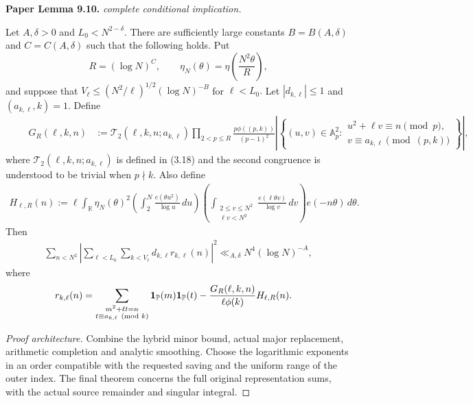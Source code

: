 \begin{lemma}
\label{goldbach_circle_method}
\leanok
\par\medskip\noindent\textbf{Paper Lemma 9.10.} \textit{complete conditional implication.}\par
Let \(A,\delta>0\) and \(L_0<N^{2-\delta}\).  There are sufficiently
large constants \(B=B(A,\delta)\) and \(C=C(A,\delta)\) such that the
following holds.  Put
\[
 R=(\log N)^C,\qquad
 \eta_N(\theta)=\eta\left(\frac{N^2\theta}{R}\right),
\]
and suppose that $V_\ell\leq (N^2/\ell)^{1/2}(\log N)^{-B}$ for $\ell<L_0.$
Let \(|d_{k,\ell}|\leq1\) and
\((a_{k,\ell},k)=1\).
Define 
\begin{align}\quad \quad
 G_R(\ell,k,n)
 &:=
 \mathcal T_2(\ell,k,n;a_{k,\ell})
 \prod_{2<p\leq R}
 \frac{p\phi((p,k))}{(p-1)^2}
 \left|\left\{(u,v)\in\mathbb A_p^2:
 \begin{array}{l}
  u^2+\ell v\equiv n\pmod p,\\
  v\equiv a_{k,\ell}\pmod{(p,k)}
 \end{array}\right\}\right|,
\end{align}
where $ \mathcal T_2(\ell,k,n;a_{k,\ell}) $ is defined in \textup{(3.18)} and the second congruence is understood to be trivial when \(p\nmid k\).
Also define
\begin{align}
 H_{\ell,R}(n)
 :=
 \ell\int_{\mathbb R}\eta_N(\theta)^2
 \left(\int_2^N\frac{e(\theta u^2)}{\log u}\,du\right)
 \left(\int_{\substack{2\leq v\leq N^2\\\ell v<N^2}}
 \frac{e(\ell\theta v)}{\log v}\,dv\right)
 e(-n\theta)\,d\theta.
\end{align}
Then
\begin{align}
 \sum_{n<N^2}\left|
 \sum_{\ell<L_0}\sum_{k<V_\ell}
 d_{k,\ell}r_{k,\ell}(n)\right|^2
 \ll_{A,\delta}N^4(\log N)^{-A},
\end{align}
where
\begin{align}
 r_{k,\ell}(n)
 &=
 \sum_{\substack{m^2+\ell t=n\\
 t\equiv a_{k,\ell}\pmod k}}
 \mathbf{1}_{\mathbb P}(m)\mathbf{1}_{\mathbb P}(t)
 -
 \frac{G_R(\ell,k,n)}{\ell\phi(k)}H_{\ell,R}(n).
\end{align}
\end{lemma}
\begin{proof}[Proof architecture]
\leanok
Combine the hybrid minor bound, actual major replacement, arithmetic completion and analytic smoothing. Choose the logarithmic exponents in an order compatible with the requested saving and the uniform range of the outer index. The final theorem concerns the full original representation sums, with the actual source remainder and singular integral.
\end{proof}

